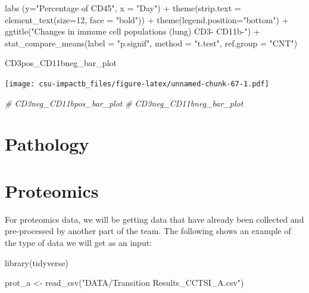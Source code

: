 \documentclass[
]{book}
\newenvironment{Shaded}{\begin{snugshade}}{\end{snugshade}}
\newcommand{\AttributeTok}[1]{\textcolor[rgb]{0.77,0.63,0.00}{#1}}
\newcommand{\CommentTok}[1]{\textcolor[rgb]{0.56,0.35,0.01}{\textit{#1}}}
\newcommand{\DecValTok}[1]{\textcolor[rgb]{0.00,0.00,0.81}{#1}}
\newcommand{\FunctionTok}[1]{\textcolor[rgb]{0.00,0.00,0.00}{#1}}
\newcommand{\NormalTok}[1]{#1}
\newcommand{\OtherTok}[1]{\textcolor[rgb]{0.56,0.35,0.01}{#1}}
\newcommand{\SpecialCharTok}[1]{\textcolor[rgb]{0.00,0.00,0.00}{#1}}
\newcommand{\StringTok}[1]{\textcolor[rgb]{0.31,0.60,0.02}{#1}}
\begin{document}
\begin{Shaded}
\begin{Highlighting}[]
  \FunctionTok{labs}\NormalTok{ (}\AttributeTok{y=}\StringTok{"Percentage of CD45"}\NormalTok{, }\AttributeTok{x =} \StringTok{"Day"}\NormalTok{) }\SpecialCharTok{+} 
  \FunctionTok{theme}\NormalTok{(}\AttributeTok{strip.text =} \FunctionTok{element\_text}\NormalTok{(}\AttributeTok{size=}\DecValTok{12}\NormalTok{, }\AttributeTok{face =} \StringTok{"bold"}\NormalTok{)) }\SpecialCharTok{+} \FunctionTok{theme}\NormalTok{(}\AttributeTok{legend.position=}\StringTok{"bottom"}\NormalTok{) }\SpecialCharTok{+}
  \FunctionTok{ggtitle}\NormalTok{(}\StringTok{"Changes in immune cell populations (lung) CD3{-} CD11b{-}"}\NormalTok{) }\SpecialCharTok{+}
  \FunctionTok{stat\_compare\_means}\NormalTok{(}\AttributeTok{label =} \StringTok{"p.signif"}\NormalTok{, }\AttributeTok{method =} \StringTok{"t.test"}\NormalTok{,}
                     \AttributeTok{ref.group =} \StringTok{"CNT"}\NormalTok{)}

\NormalTok{CD3pos\_CD11bneg\_bar\_plot}
\end{Highlighting}
\end{Shaded}

\texttt{[image: csu-impactb\_files/figure-latex/unnamed-chunk-67-1.pdf]}

\begin{Shaded}
\begin{Highlighting}[]
\CommentTok{\# CD3neg\_CD11bpos\_bar\_plot}
\CommentTok{\# CD3neg\_CD11bneg\_bar\_plot}
\end{Highlighting}
\end{Shaded}

\hypertarget{pathology}{%
\chapter{Pathology}\label{pathology}}

\hypertarget{proteomics}{%
\chapter{Proteomics}\label{proteomics}}

For proteomics data, we will be getting data that have already been collected and
pre-processed by another part of the team. The following shows an example of the
type of data we will get as an input:

\begin{Shaded}
\begin{Highlighting}[]
\FunctionTok{library}\NormalTok{(tidyverse)}

\NormalTok{prot\_a }\OtherTok{\textless{}{-}} \FunctionTok{read\_csv}\NormalTok{(}\StringTok{"DATA/Transition Results\_CCTSI\_A.csv"}\NormalTok{)}
\end{Highlighting}
\end{Shaded}
\end{document}
